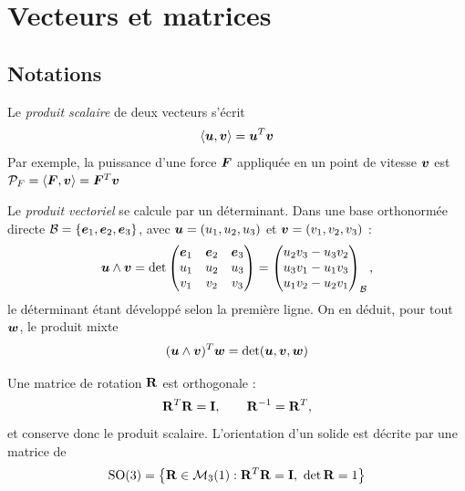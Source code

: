 
\section{Vecteurs et matrices}

\subsection{Notations}

Le \emph{produit scalaire} de deux vecteurs s'écrit
\[
    \langle \bm{u},\bm{v}\rangle = \bm{u}^T\bm{v}
\]
Par exemple, la puissance d'une force $\bm{F}$ appliquée en un point
de vitesse $\bm{v}$ est
$\mathcal{P}_F = \langle\bm{F},\bm{v}\rangle = \bm{F}^T\bm{v}$

Le \emph{produit vectoriel} se calcule par un déterminant. Dans une base
orthonormée directe $\mathcal{B} = \{\bm{e}_1,\bm{e}_2,\bm{e}_3\}$,
avec $\bm{u} = (u_1,u_2,u_3)$ et $\bm{v} = (v_1,v_2,v_3)$ :
\[
    \bm{u}\wedge\bm{v}
    = \det\begin{pmatrix}
        \bm{e}_1 & \bm{e}_2 & \bm{e}_3\\
        u_1 & u_2 & u_3\\
        v_1 & v_2 & v_3
    \end{pmatrix}
    = \begin{pmatrix}
        u_2v_3 - u_3v_2\\
        u_3v_1 - u_1v_3\\
        u_1v_2 - u_2v_1
    \end{pmatrix}_{\mathcal{B}},
\]
le déterminant étant développé selon la première ligne. On en
déduit, pour tout $\bm{w}$, le produit mixte
\[
    (\bm{u}\wedge\bm{v})^T\bm{w}
    = \det(\bm{u},\bm{v},\bm{w})
\]

Une matrice de rotation $\mathbf{R}$ est orthogonale :
\[
    \mathbf{R}^T\mathbf{R} = \mathbf{I},
    \qquad
    \mathbf{R}^{-1} = \mathbf{R}^T,
\]
et conserve donc le produit scalaire. L'orientation d'un solide est
décrite par une matrice de
\[
    \mathrm{SO}(3) = \left\{\mathbf{R}\in\mathcal{M}_3(1) :
    \mathbf{R}^T\mathbf{R} = \mathbf{I},\ \det\mathbf{R} = 1\right\}
\]

